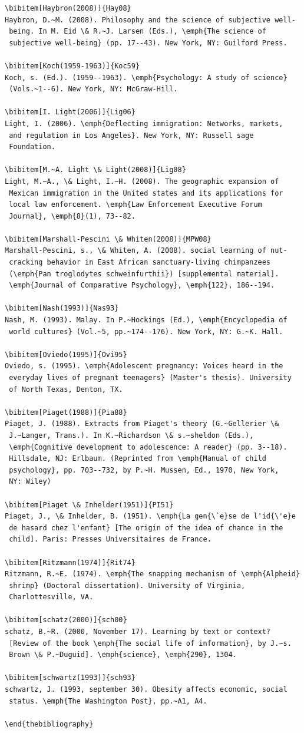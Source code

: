 \documentclass[]{interact}
\theoremstyle{plain}%
\theoremstyle{definition}
\theoremstyle{remark}
\begin{document}
\begin{verbatim}
\bibitem[Haybron(2008)]{Hay08}
Haybron, D.~M. (2008). Philosophy and the science of subjective well-
 being. In M. Eid \& R.~J. Larsen (Eds.), \emph{The science of
 subjective well-being} (pp. 17--43). New York, NY: Guilford Press.

\bibitem[Koch(1959-1963)]{Koc59}
Koch, s. (Ed.). (1959--1963). \emph{Psychology: A study of science}
 (Vols.~1--6). New York, NY: McGraw-Hill.

\bibitem[I. Light(2006)]{Lig06}
Light, I. (2006). \emph{Deflecting immigration: Networks, markets,
 and regulation in Los Angeles}. New York, NY: Russell sage
 Foundation.

\bibitem[M.~A. Light \& Light(2008)]{Lig08}
Light, M.~A., \& Light, I.~H. (2008). The geographic expansion of
 Mexican immigration in the United states and its applications for
 local law enforcement. \emph{Law Enforcement Executive Forum
 Journal}, \emph{8}(1), 73--82.

\bibitem[Marshall-Pescini \& Whiten(2008)]{MPW08}
Marshall-Pescini, s., \& Whiten, A. (2008). social learning of nut-
 cracking behavior in East African sanctuary-living chimpanzees
 (\emph{Pan troglodytes schweinfurthii}) [supplemental material].
 \emph{Journal of Comparative Psychology}, \emph{122}, 186--194.

\bibitem[Nash(1993)]{Nas93}
Nash, M. (1993). Malay. In P.~Hockings (Ed.), \emph{Encyclopedia of
 world cultures} (Vol.~5, pp.~174--176). New York, NY: G.~K. Hall.

\bibitem[Oviedo(1995)]{Ovi95}
Oviedo, s. (1995). \emph{Adolescent pregnancy: Voices heard in the
 everyday lives of pregnant teenagers} (Master's thesis). University
 of North Texas, Denton, TX.

\bibitem[Piaget(1988)]{Pia88}
Piaget, J. (1988). Extracts from Piaget's theory (G.~Gellerier \&
 J.~Langer, Trans.). In K.~Richardson \& s.~sheldon (Eds.),
 \emph{Cognitive development to adolescence: A reader} (pp. 3--18).
 Hillsdale, NJ: Erlbaum. (Reprinted from \emph{Manual of child
 psychology}, pp. 703--732, by P.~H. Mussen, Ed., 1970, New York,
 NY: Wiley)

\bibitem[Piaget \& Inhelder(1951)]{PI51}
Piaget, J., \& Inhelder, B. (1951). \emph{La gen{\`e}se de l'id{\'e}e
 de hasard chez l'enfant} [The origin of the idea of chance in the
 child]. Paris: Presses Universitaires de France.

\bibitem[Ritzmann(1974)]{Rit74}
Ritzmann, R.~E. (1974). \emph{The snapping mechanism of \emph{Alpheid}
 shrimp} (Doctoral dissertation). University of Virginia,
 Charlottesville, VA.

\bibitem[schatz(2000)]{sch00}
schatz, B.~R. (2000, November 17). Learning by text or context?
 [Review of the book \emph{The social life of information}, by J.~s.
 Brown \& P.~Duguid]. \emph{science}, \emph{290}, 1304.

\bibitem[schwartz(1993)]{sch93}
schwartz, J. (1993, september 30). Obesity affects economic, social
 status. \emph{The Washington Post}, pp.~A1, A4.

\end{thebibliography}
\end{verbatim}
\end{document}
